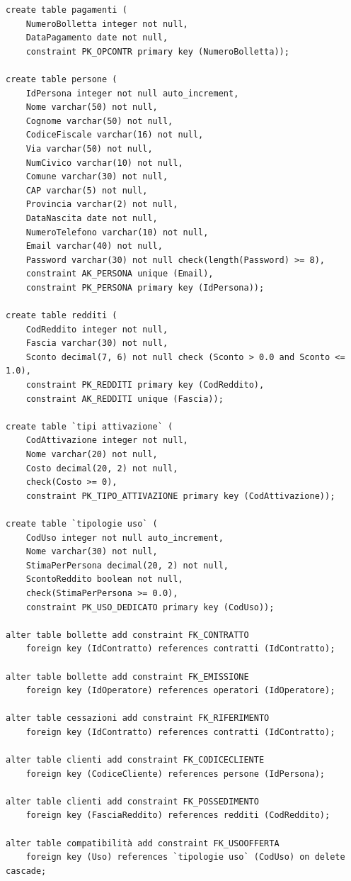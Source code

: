 \documentclass[a4paper,12pt]{report}
\begin{document}
\begin{lstlisting}
create table pagamenti (
    NumeroBolletta integer not null,
    DataPagamento date not null,
    constraint PK_OPCONTR primary key (NumeroBolletta));

create table persone (
    IdPersona integer not null auto_increment,
    Nome varchar(50) not null,
    Cognome varchar(50) not null,
    CodiceFiscale varchar(16) not null,
    Via varchar(50) not null,
    NumCivico varchar(10) not null,
    Comune varchar(30) not null,
    CAP varchar(5) not null,
    Provincia varchar(2) not null,
    DataNascita date not null,
    NumeroTelefono varchar(10) not null,
    Email varchar(40) not null,
    Password varchar(30) not null check(length(Password) >= 8),
    constraint AK_PERSONA unique (Email),
    constraint PK_PERSONA primary key (IdPersona));
    
create table redditi (
    CodReddito integer not null,
    Fascia varchar(30) not null,
    Sconto decimal(7, 6) not null check (Sconto > 0.0 and Sconto <= 1.0),
    constraint PK_REDDITI primary key (CodReddito),
    constraint AK_REDDITI unique (Fascia));

create table `tipi attivazione` (
    CodAttivazione integer not null,
    Nome varchar(20) not null,
    Costo decimal(20, 2) not null,
    check(Costo >= 0),
    constraint PK_TIPO_ATTIVAZIONE primary key (CodAttivazione));

create table `tipologie uso` (
    CodUso integer not null auto_increment,
    Nome varchar(30) not null,
    StimaPerPersona decimal(20, 2) not null,
    ScontoReddito boolean not null,
    check(StimaPerPersona >= 0.0),
    constraint PK_USO_DEDICATO primary key (CodUso));

alter table bollette add constraint FK_CONTRATTO
    foreign key (IdContratto) references contratti (IdContratto);
     
alter table bollette add constraint FK_EMISSIONE
    foreign key (IdOperatore) references operatori (IdOperatore);
     
alter table cessazioni add constraint FK_RIFERIMENTO
    foreign key (IdContratto) references contratti (IdContratto);
     
alter table clienti add constraint FK_CODICECLIENTE
    foreign key (CodiceCliente) references persone (IdPersona);
     
alter table clienti add constraint FK_POSSEDIMENTO
    foreign key (FasciaReddito) references redditi (CodReddito);

alter table compatibilità add constraint FK_USOOFFERTA
    foreign key (Uso) references `tipologie uso` (CodUso) on delete cascade;


\end{lstlisting}
\end{document}
